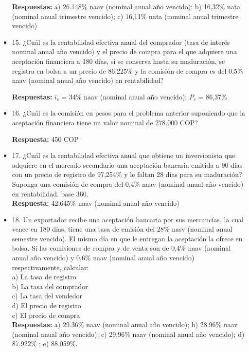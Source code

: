 \begin{itemize}
       \textbf{Respuestas:}  a) 26.148\% naav (nominal anual año vencido); b) 16,32\% nata (nominal anual trimestre vencido); c) 16,11\% nata (nominal anual trimestre vencido)\\
       \medskip

 \item 15. ¿Cuál es la rentabilidad efectiva anual del comprador (tasa de interés nominal anual año vencido) y el precio de compra para el que adquiere una aceptación financiera a 180 días, si se conserva hasta su maduración, se registra en bolsa a un precio de 86,225\% y la comisión de compra es del 0.5\% naav (nominal anual año vencido) en rentabilidad?
 
       \textbf{Respuestas:} $i_{c}$ = 34\% naav (nominal anual año vencido); $P_{c}$ = 86,37\%\\
       \medskip

 \item 16. ¿Cuál es la comisión en pesos para el problema anterior suponiendo que la aceptación financiera tiene un valor nominal de 278.000 COP?
 
       \textbf{Respuesta:} 450 COP\\
       \medskip

 \item 17. ¿Cuál es la rentabilidad efectiva anual que obtiene un inversionista que adquiere en el mercado secundario una aceptación bancaria emitida a 90 días con un precio de registro de 97,254\% y le faltan 28 días para su maduración? Suponga una comisión de compra del 0,4\% naav (nominal anual año vencido) en rentabilidad. base 360.\\
       \textbf{Respuesta:} 42,645\% naav (nominal anual año vencido)\\
       \medskip

 \item 18. Un exportador recibe una aceptación bancaria por sus mercancías, la cual vence en 180 días, tiene una tasa de emisión del 28\% nasv (nominal anual semestre vencido). El mismo día en que le entregan la aceptación la ofrece en bolsa. Si las comisiones de compra y de venta son de 0,4\% naav (nominal anual año vencido) y 0,6\% naav (nominal anual año vencido) respectivamente, calcular:\\
       a) La tasa de registro\\
       b) La tasa del comprador\\
       c) La tasa del vendedor\\
       d) El precio de registro\\
       e) El precio de compra\\
       \textbf{Respuestas:} a) 29.36\% naav (nominal anual año vencido); b) 28.96\% naav (nominal anual año vencido); c) 29,96\% naav (nominal anual año vencido); d) 87,922\% ; e) 88.059\%.\\
       \medskip


\end{itemize}
